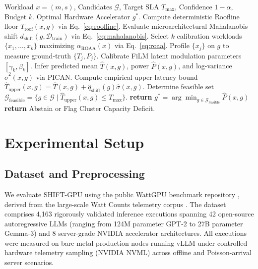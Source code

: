 \documentclass[preprint,12pt]{elsarticle}
\begin{document}
\begin{algorithm}[t]
\caption{SHIFT-GPU Admission Control, Conformal Risk Calibration, and Active Adaptation}
\label{alg:shift_gpu}
\begin{algorithmic}[1]
\REQUIRE Workload $x = (m, s)$, Candidates $\mathcal{G}$, Target SLA $T_{\max}$, Confidence $1-\alpha$, Budget $k$.
\ENSURE Optimal Hardware Accelerator $g^*$.
    \STATE Compute deterministic Roofline floor $T_{\text{roof}}(x, g)$ via Eq.~\eqref{eq:roofline}.
    \STATE Evaluate microarchitectural Mahalanobis shift $d_{\text{shift}}(g, \mathcal{D}_{\text{train}})$ via Eq.~\eqref{eq:mahalanobis}.
        \STATE Select $k$ calibration workloads $\{x_1, \dots, x_k\}$ maximizing $\alpha_{\text{ROAA}}(x)$ via Eq.~\eqref{eq:roaa}.
        \STATE Profile $\{x_j\}$ on $g$ to measure ground-truth $\{T_j, P_j\}$.
        \STATE Calibrate FiLM latent modulation parameters $[\gamma_k, \beta_k]$.
    \ENDIF
    \STATE Infer predicted mean $\hat{T}(x, g)$, power $\hat{P}(x, g)$, and log-variance $\hat{\sigma}^2(x, g)$ via PICAN.
    \STATE Compute empirical upper latency bound $\hat{T}_{\text{upper}}(x, g) = \hat{T}(x, g) + \hat{q}_{\text{shift}}(g) \hat{\sigma}(x, g)$.
\ENDFOR
\STATE Determine feasible set $\mathcal{G}_{\text{feasible}} = \{g \in \mathcal{G} \mid \hat{T}_{\text{upper}}(x, g) \le T_{\max}\}$.
    \STATE \textbf{return} $g^* = \arg\min_{g \in \mathcal{G}_{\text{feasible}}} \hat{P}(x, g)$
\ELSE
    \STATE \textbf{return} Abstain or Flag Cluster Capacity Deficit.
\ENDIF
\end{algorithmic}
\end{algorithm}

\section{Experimental Setup}
\label{sec:experiments}

\subsection{Dataset and Preprocessing}
We evaluate SHIFT-GPU using the public WattGPU benchmark repository \citep{fadel2026wattgpu}, derived from the large-scale Watt Counts telemetry corpus \citep{fadel2026wattcounts}. The dataset comprises 4,163 rigorously validated inference executions spanning 42 open-source autoregressive LLMs (ranging from 124M parameter GPT-2 to 27B parameter Gemma-3) and 8 server-grade NVIDIA accelerator architectures. All executions were measured on bare-metal production nodes running vLLM under controlled hardware telemetry sampling (NVIDIA NVML) across offline and Poisson-arrival server scenarios.
\end{document}
